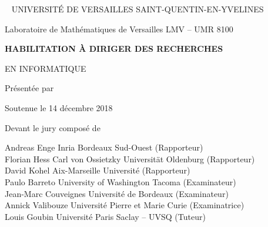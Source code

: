 \begin{titlingpage}
  \setlength{\parindent}{0pt}
  
  \thispagestyle{insttitle}
  
  \begin{center}
    ~\vfill
    \Large{\MakeUppercase{Université de Versailles Saint-Quentin-en-Yvelines}}
    \par\vspace{\onelineskip}
    \Large{Laboratoire de Mathématiques de Versailles LMV -- UMR 8100}
    \par\vspace{3\onelineskip}
    \LARGE{\bf\MakeUppercase{Habilitation à diriger des recherches}}
    \par\vspace{\onelineskip}
    \Large{\MakeUppercase{en Informatique}}
    \par\vspace{2\onelineskip}
    \large{Présentée par}
    \par\vspace{0.5\onelineskip}
    \huge{\bf\MakeUppercase{\theauthor}}
    \par\vspace{2\onelineskip}
    \Huge{\bf\MakeUppercase{\thetitle}}
    \par\vspace{3\onelineskip}
    \large{Soutenue le 14 décembre 2018}
    \par\vfill
    \large{Devant le jury composé de}
    \par\vspace{\onelineskip}
    \normalsize
    Andreas Enge \hfill Inria Bordeaux Sud-Ouest \hfill (Rapporteur)\\
    Florian Hess \hfill Carl von Ossietzky Universität Oldenburg \hfill (Rapporteur)\\
    David Kohel \hfill Aix-Marseille Université \hfill (Rapporteur)\\
    Paulo Barreto \hfill University of Washington Tacoma \hfill (Examinateur)\\
    Jean-Marc Couveignes \hfill Université de Bordeaux \hfill (Examinateur)\\
    Annick Valibouze \hfill Université Pierre et Marie Curie \hfill (Examinatrice)\\
    Louis Goubin \hfill Université Paris Saclay -- UVSQ \hfill (Tuteur)
    \vfill
  \end{center}
  
  \clearpage


\end{titlingpage}
